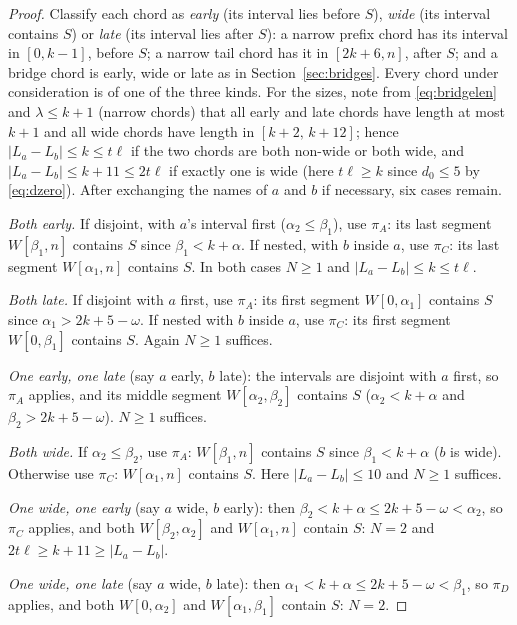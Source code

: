 \documentclass[11pt]{article}
\theoremstyle{definition}
\begin{document}
\begin{proof}
Classify each chord as \emph{early} (its interval lies before $S$),
\emph{wide} (its interval contains $S$) or \emph{late} (its interval lies
after $S$): a narrow prefix chord has its interval in $[0,k-1]$, before
$S$; a narrow tail chord has it in $[2k+6,n]$, after $S$; and a bridge
chord is early, wide or late as in Section~\ref{sec:bridges}. Every chord
under consideration is of one of the three kinds. For the sizes, note from
\eqref{eq:bridgelen} and $\lambda\le k+1$ (narrow chords) that all early
and late chords have length at most $k+1$ and all wide chords have length
in $[k+2,\,k+12]$; hence $|L_a-L_b|\le k\le t\ell$ if the two chords are
both non-wide or both wide, and $|L_a-L_b|\le k+11\le 2t\ell$ if exactly
one is wide (here $t\ell\ge k$ since $d_0\le5$ by \eqref{eq:dzero}).
After exchanging the names of $a$ and $b$ if necessary, six cases remain.

\emph{Both early.} If disjoint, with $a$'s interval first
($\alpha_2\le\beta_1$), use $\pi_A$: its last segment $W[\beta_1,n]$
contains $S$ since $\beta_1<k+\alpha$. If nested, with $b$ inside $a$, use
$\pi_C$: its last segment $W[\alpha_1,n]$ contains $S$. In both cases
$N\ge1$ and $|L_a-L_b|\le k\le t\ell$.

\emph{Both late.} If disjoint with $a$ first, use $\pi_A$: its first
segment $W[0,\alpha_1]$ contains $S$ since $\alpha_1>2k+5-\omega$. If
nested with $b$ inside $a$, use $\pi_C$: its first segment $W[0,\beta_1]$
contains $S$. Again $N\ge1$ suffices.

\emph{One early, one late} (say $a$ early, $b$ late): the intervals are
disjoint with $a$ first, so $\pi_A$ applies, and its middle segment
$W[\alpha_2,\beta_2]$ contains $S$ ($\alpha_2<k+\alpha$ and
$\beta_2>2k+5-\omega$). $N\ge1$ suffices.

\emph{Both wide.} If $\alpha_2\le\beta_2$, use $\pi_A$: $W[\beta_1,n]$
contains $S$ since $\beta_1<k+\alpha$ ($b$ is wide). Otherwise use
$\pi_C$: $W[\alpha_1,n]$ contains $S$. Here $|L_a-L_b|\le10$ and $N\ge1$
suffices.

\emph{One wide, one early} (say $a$ wide, $b$ early): then
$\beta_2<k+\alpha\le 2k+5-\omega<\alpha_2$, so $\pi_C$ applies, and both
$W[\beta_2,\alpha_2]$ and $W[\alpha_1,n]$ contain $S$: $N=2$ and
$2t\ell\ge k+11\ge|L_a-L_b|$.

\emph{One wide, one late} (say $a$ wide, $b$ late): then
$\alpha_1<k+\alpha\le 2k+5-\omega<\beta_1$, so $\pi_D$ applies, and both
$W[0,\alpha_2]$ and $W[\alpha_1,\beta_1]$ contain $S$: $N=2$.


\end{proof}
\end{document}
